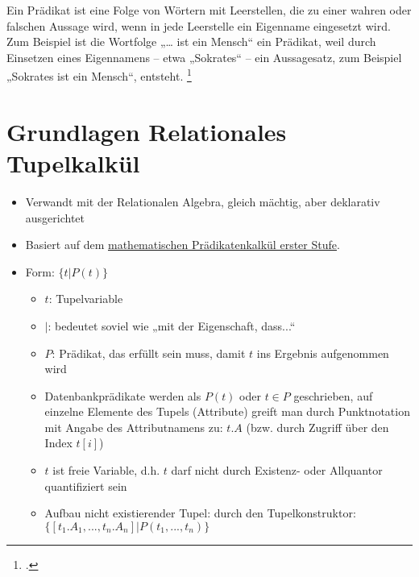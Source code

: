 \documentclass{lehramt-informatik-haupt}
\begin{document}
Ein Prädikat ist eine Folge von Wörtern mit Leerstellen, die zu einer
wahren oder falschen Aussage wird, wenn in jede Leerstelle ein Eigenname
eingesetzt wird. Zum Beispiel ist die Wortfolge „… ist ein Mensch“ ein
Prädikat, weil durch Einsetzen eines Eigennamens – etwa „Sokrates“ – ein
Aussagesatz, zum Beispiel „Sokrates ist ein Mensch“, entsteht.
\footcite{wiki:praedikatenlogik}

%

\section{Grundlagen Relationales Tupelkalkül}

\begin{itemize}
\item Verwandt mit der Relationalen Algebra, gleich mächtig, aber
deklarativ ausgerichtet

\item Basiert auf dem
\href{https://de.wikipedia.org/wiki/Pr%C3%A4dikatenlogik_erster_Stufe}
{mathematischen Prädikatenkalkül erster Stufe}.

\item Form: $\{t | P(t)\}$

\begin{itemize}
\item $t$: Tupelvariable

\item $|$: bedeutet soviel wie „mit der Eigenschaft, dass...“

\item $P$: Prädikat, das erfüllt sein muss, damit $t$ ins Ergebnis
aufgenommen wird

\item Datenbankprädikate werden als $P(t)$ oder $t \in P$ geschrieben,
auf einzelne Elemente des Tupels (Attribute) greift man durch
Punktnotation mit Angabe des Attributnamens zu: $t.A$ (bzw. durch
Zugriff über den Index $t[i]$)

\item $t$ ist freie Variable, d.h. $t$ darf nicht durch Existenz- oder
Allquantor quantifiziert sein

\item Aufbau nicht existierender Tupel: durch den Tupelkonstruktor:
$\{[t_1.A_1,...,t_n.A_n] | P(t_1,...,t_n)\}$

\end{itemize}
\end{itemize}
\end{document}

